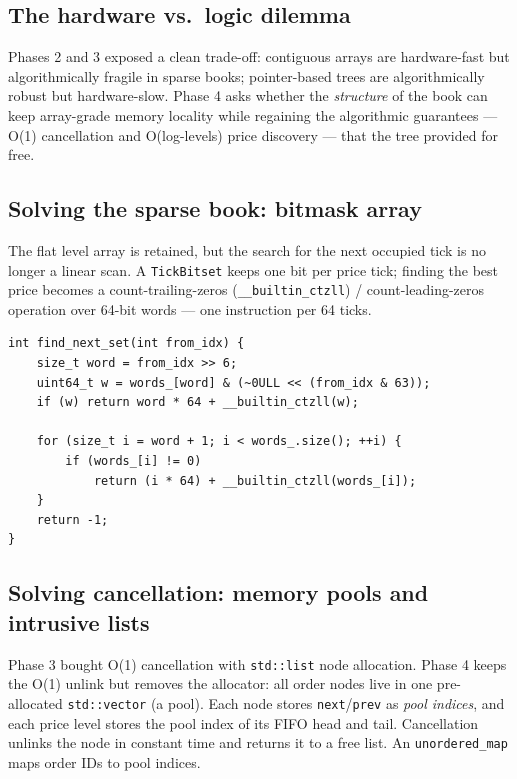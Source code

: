 \documentclass[11pt,a4paper]{article}
\begin{document}
\subsection{The hardware vs.\ logic dilemma}

Phases 2 and 3 exposed a clean trade-off: contiguous arrays are
hardware-fast but algorithmically fragile in sparse books; pointer-based
trees are algorithmically robust but hardware-slow. Phase 4 asks whether the
\emph{structure} of the book can keep array-grade memory locality while
regaining the algorithmic guarantees --- O(1) cancellation and O(log-levels)
price discovery --- that the tree provided for free.

\subsection{Solving the sparse book: bitmask array}

The flat level array is retained, but the search for the next occupied tick
is no longer a linear scan. A \texttt{TickBitset} keeps one bit per price
tick; finding the best price becomes a count-trailing-zeros
(\texttt{\_\_builtin\_ctzll}) / count-leading-zeros operation over 64-bit
words --- one instruction per 64 ticks.

\begin{lstlisting}[caption={Bitmask next-price discovery (phase 4)}]
int find_next_set(int from_idx) {
    size_t word = from_idx >> 6;
    uint64_t w = words_[word] & (~0ULL << (from_idx & 63));
    if (w) return word * 64 + __builtin_ctzll(w);

    for (size_t i = word + 1; i < words_.size(); ++i) {
        if (words_[i] != 0)
            return (i * 64) + __builtin_ctzll(words_[i]);
    }
    return -1;
}
\end{lstlisting}

\subsection{Solving cancellation: memory pools and intrusive lists}

Phase 3 bought O(1) cancellation with \texttt{std::list} node allocation.
Phase 4 keeps the O(1) unlink but removes the allocator: all order nodes
live in one pre-allocated \texttt{std::vector} (a pool). Each node stores
\texttt{next}/\texttt{prev} as \emph{pool indices}, and each price level
stores the pool index of its FIFO head and tail. Cancellation unlinks the
node in constant time and returns it to a free list. An
\texttt{unordered\_map} maps order IDs to pool indices.
\end{document}
